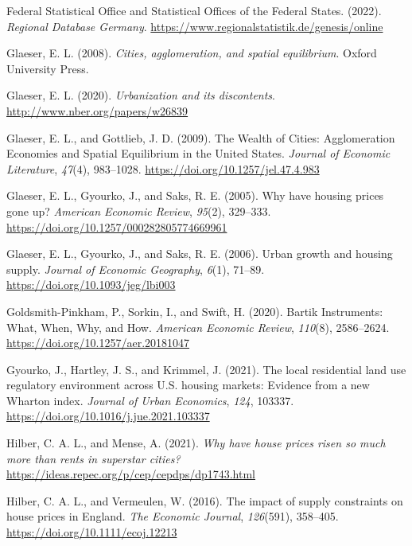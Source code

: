 \documentclass[
  12pt,
]{article}
\newlength{\cslhangindent}
\newenvironment{CSLReferences}[2] %
 {\begin{list}{}{%
  \setlength{\itemindent}{0pt}
  \setlength{\leftmargin}{0pt}
  \setlength{\parsep}{0pt}
  \ifodd #1
   \setlength{\leftmargin}{\cslhangindent}
   \setlength{\itemindent}{-1\cslhangindent}
  \fi
  \setlength{\itemsep}{#2\baselineskip}}}
 {\end{list}}
\begin{document}
\begin{CSLReferences}{1}{0}
Federal Statistical Office and Statistical Offices of the Federal States. (2022). \emph{{Regional Database Germany}}. \url{https://www.regionalstatistik.de/genesis/online}

Glaeser, E. L. (2008). \emph{Cities, agglomeration, and spatial equilibrium}. Oxford University Press.

Glaeser, E. L. (2020). \emph{Urbanization and its discontents}. \url{http://www.nber.org/papers/w26839}

Glaeser, E. L., and Gottlieb, J. D. (2009). The {Wealth} of {Cities}: {Agglomeration Economies} and {Spatial Equilibrium} in the {United States}. \emph{Journal of Economic Literature}, \emph{47}(4), 983--1028. \url{https://doi.org/10.1257/jel.47.4.983}

Glaeser, E. L., Gyourko, J., and Saks, R. E. (2005). Why have housing prices gone up? \emph{American Economic Review}, \emph{95}(2), 329--333. \url{https://doi.org/10.1257/000282805774669961}

Glaeser, E. L., Gyourko, J., and Saks, R. E. (2006). Urban growth and housing supply. \emph{Journal of Economic Geography}, \emph{6}(1), 71--89. \url{https://doi.org/10.1093/jeg/lbi003}

Goldsmith-Pinkham, P., Sorkin, I., and Swift, H. (2020). Bartik Instruments: What, When, Why, and How. \emph{American Economic Review}, \emph{110}(8), 2586--2624. \url{https://doi.org/10.1257/aer.20181047}

Gyourko, J., Hartley, J. S., and Krimmel, J. (2021). The local residential land use regulatory environment across {U.S.} housing markets: Evidence from a new {Wharton} index. \emph{Journal of Urban Economics}, \emph{124}, 103337. \url{https://doi.org/10.1016/j.jue.2021.103337}

Hilber, C. A. L., and Mense, A. (2021). \emph{Why have house prices risen so much more than rents in superstar cities?} \url{https://ideas.repec.org/p/cep/cepdps/dp1743.html}

Hilber, C. A. L., and Vermeulen, W. (2016). The impact of supply constraints on house prices in {England}. \emph{The Economic Journal}, \emph{126}(591), 358--405. \url{https://doi.org/10.1111/ecoj.12213}


\end{CSLReferences}
\end{document}
